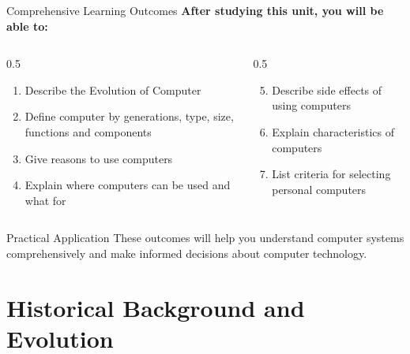 \documentclass[aspectratio=169]{beamer}
\begin{document}
\begin{frame}{Comprehensive Learning Outcomes}
    \textbf{After studying this unit, you will be able to:}
    
    \begin{columns}
        \begin{column}{0.5\textwidth}
            \begin{enumerate}
                \item Describe the Evolution of Computer
                \item Define computer by generations, type, size, functions and components
                \item Give reasons to use computers
                \item Explain where computers can be used and what for
            \end{enumerate}
        \end{column}
        \begin{column}{0.5\textwidth}
            \begin{enumerate}
                \setcounter{enumi}{4}
                \item Describe side effects of using computers
                \item Explain characteristics of computers
                \item List criteria for selecting personal computers
            \end{enumerate}
        \end{column}
    \end{columns}
    
    \vspace{0.5cm}
    \begin{exampleblock}{Practical Application}
        These outcomes will help you understand computer systems comprehensively and make informed decisions about computer technology.
    \end{exampleblock}
\end{frame}

\section{Historical Background and Evolution}
\end{document}
